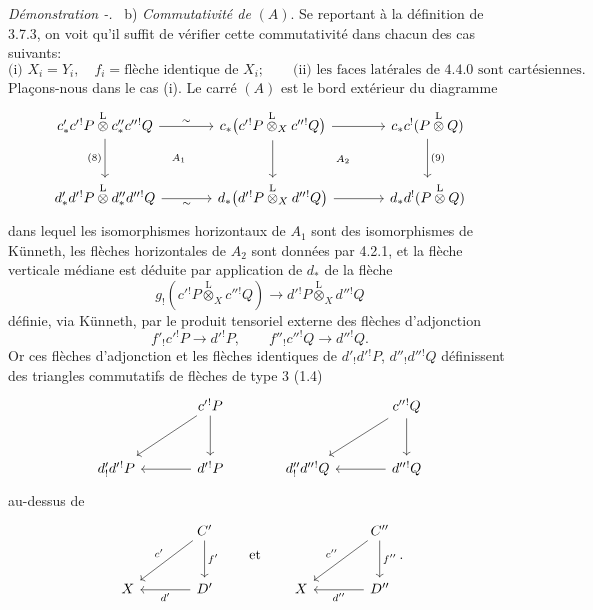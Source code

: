 \documentclass[11pt]{article}
\newenvironment{prooftext}[1][Proof]{\par\noindent\emph{#1.}\ }{\par\medskip}
\begin{document}
\begin{prooftext}[Démonstration -]
b) \emph{Commutativité de} $(A)$. Se reportant à la définition de 3.7.3, on voit qu'il suffit de vérifier cette commutativité dans chacun des cas suivants:
\[
\text{(i) } X_i=Y_i,\quad f_i=\text{flèche identique de }X_i;\qquad
\text{(ii) les faces latérales de 4.4.0 sont cartésiennes.}
\]
Plaçons-nous dans le cas (i). Le carré $(A)$ est le bord extérieur du diagramme
\[
\begin{tikzcd}[column sep=large,row sep=large]
c'_*c'{}^!P\overset{\mathrm{L}}{\otimes}c''_*c''{}^!Q
 \arrow[r,"\sim"] \arrow[d,"(8)"'] &
c_*\bigl(c'{}^!P\overset{\mathrm{L}}{\otimes}_Xc''{}^!Q\bigr)
 \arrow[r] \arrow[d] &
c_*c^!(P\overset{\mathrm{L}}{\otimes} Q)\arrow[d,"(9)"]\\
d'_*d'{}^!P\overset{\mathrm{L}}{\otimes}d''_*d''{}^!Q
 \arrow[r,"\sim"'] &
d_*\bigl(d'{}^!P\overset{\mathrm{L}}{\otimes}_Xd''{}^!Q\bigr)
 \arrow[r] &
d_*d^!(P\overset{\mathrm{L}}{\otimes} Q)
\arrow[from=1-1,to=2-2, phantom, "\scriptstyle A_1"]
\arrow[from=1-2,to=2-3, phantom, "\scriptstyle A_2"]
\end{tikzcd}
\]
dans lequel les isomorphismes horizontaux de $A_1$ sont des isomorphismes de Künneth, les flèches horizontales de $A_2$ sont données par 4.2.1, et la flèche verticale médiane est déduite par application de $d_*$ de la flèche
\[
g_!(c'{}^!P\overset{\mathrm{L}}{\otimes}_Xc''{}^!Q)\longrightarrow d'{}^!P\overset{\mathrm{L}}{\otimes}_Xd''{}^!Q
\]
définie, via Künneth, par le produit tensoriel externe des flèches d'adjonction
\[
f'_!c'{}^!P\longrightarrow d'{}^!P,\qquad
f''_!c''{}^!Q\longrightarrow d''{}^!Q.
\]
Or ces flèches d'adjonction et les flèches identiques de $d'_!d'{}^!P$, $d''_!d''{}^!Q$ définissent des triangles commutatifs de flèches de type $3$ (1.4)
\[
\begin{tikzcd}[column sep=large,row sep=large]
& c'{}^!P \arrow[d] \arrow[dl] & & c''{}^!Q \arrow[d]\arrow[dl]\\
d'_!d'{}^!P & d'{}^!P\arrow[l] & d''_!d''{}^!Q & d''{}^!Q\arrow[l]
\end{tikzcd}
\]
au-dessus de
\[
\begin{tikzcd}[column sep=large,row sep=large]
& C' \arrow[d,"f'"] \arrow[dl,"c'"']\\
X & D'\arrow[l,"d'"]
\end{tikzcd}
\qquad\text{et}\qquad
\begin{tikzcd}[column sep=large,row sep=large]
& C'' \arrow[d,"f''"] \arrow[dl,"c''"']\\
X & D''\arrow[l,"d''"]
\end{tikzcd}.
\]
\end{prooftext}
\end{document}
